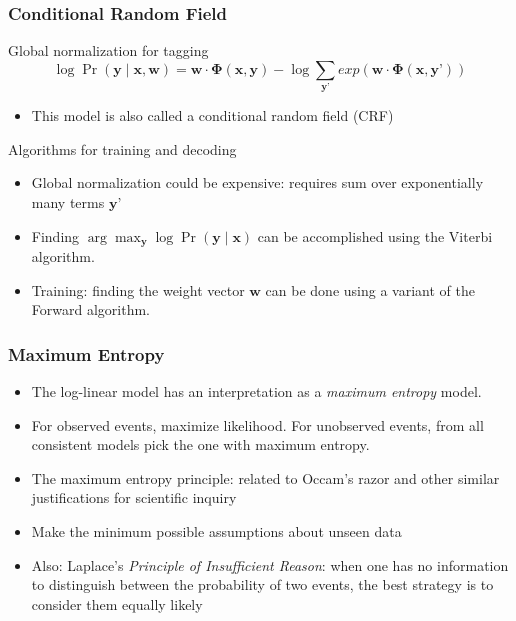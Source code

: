 \begin{frame}
\frametitle{Conditional Random Field}
\begin{block}{Global normalization for tagging}
\[ \log \Pr(\textbf{y} \mid \textbf{x}, \textbf{w}) = \textbf{w} \cdot \mathbf{\Phi}(\textbf{x}, \textbf{y}) - \log \sum_{\textbf{y'}} exp\left( \textbf{w} \cdot \mathbf{\Phi}(\textbf{x}, \textbf{y'}) \right) \]
\begin{itemize}
\item This model is also called a conditional random field (CRF)
\end{itemize}
\end{block}
\pause
\begin{block}{Algorithms for training and decoding}
\begin{itemize}
\item Global normalization could be expensive: requires sum over exponentially many terms $\textbf{y'}$
\item Finding $\arg\max_{\textbf{y}} \log \Pr(\textbf{y} \mid \textbf{x})$ can be accomplished using the Viterbi algorithm.
\item Training: finding the weight vector $\textbf{w}$ can be done using a variant of the Forward algorithm.
\end{itemize}
\end{block}
\end{frame}





\begin{frame}
\frametitle{Maximum Entropy}
\begin{itemize}[<+->]
\item The log-linear model has an interpretation as a {\it maximum entropy} model.
\item For observed events, maximize likelihood. For unobserved events, from all
consistent models pick the one with maximum entropy.
\item The maximum entropy principle: related to Occam's razor and
  other similar justifications for scientific inquiry
\item Make the minimum possible assumptions about unseen data
\item Also: Laplace's {\em Principle of Insufficient Reason}: when one
  has no information to distinguish between the probability of two
  events, the best strategy is to consider them equally likely
\end{itemize}
\end{frame}

